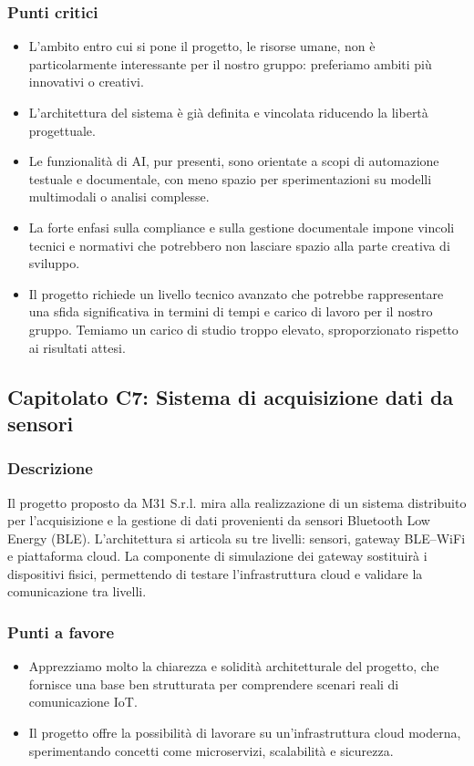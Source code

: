 \documentclass[a4paper,12pt]{article}
\begin{document}
\subsubsection{Punti critici}
\begin{itemize}
    \item L’ambito entro cui si pone il progetto, le risorse umane, non è particolarmente interessante per il nostro gruppo: preferiamo ambiti più innovativi o creativi.
    \item L’architettura del sistema è già definita e vincolata riducendo la libertà progettuale.
    \item Le funzionalità di AI, pur presenti, sono orientate a scopi di automazione testuale e documentale, con meno spazio per sperimentazioni su modelli multimodali o analisi complesse.
    \item La forte enfasi sulla compliance e sulla gestione documentale impone vincoli tecnici e normativi che potrebbero non lasciare spazio alla parte creativa di sviluppo.
    \item Il progetto richiede un livello tecnico avanzato che potrebbe rappresentare una sfida significativa in termini di tempi e carico di lavoro per il nostro gruppo. Temiamo un carico di studio troppo elevato, sproporzionato rispetto ai risultati attesi.
\end{itemize}





\subsection{Capitolato C7: Sistema di acquisizione dati da sensori}

\subsubsection{Descrizione}
Il progetto proposto da M31 S.r.l. mira alla realizzazione di un sistema distribuito per l’acquisizione e la gestione di dati provenienti da sensori Bluetooth Low Energy (BLE). L’architettura si articola su tre livelli: sensori, gateway BLE–WiFi e piattaforma cloud. La componente di simulazione dei gateway sostituirà i dispositivi fisici, permettendo di testare l’infrastruttura cloud e validare la comunicazione tra livelli.

\subsubsection{Punti a favore}
\begin{itemize}
    \item Apprezziamo molto la chiarezza e solidità architetturale del progetto, che fornisce una base ben strutturata per comprendere scenari reali di comunicazione IoT.
    \item Il progetto offre la possibilità di lavorare su un’infrastruttura cloud moderna, sperimentando concetti come microservizi, scalabilità e sicurezza.
\end{itemize}
\end{document}
